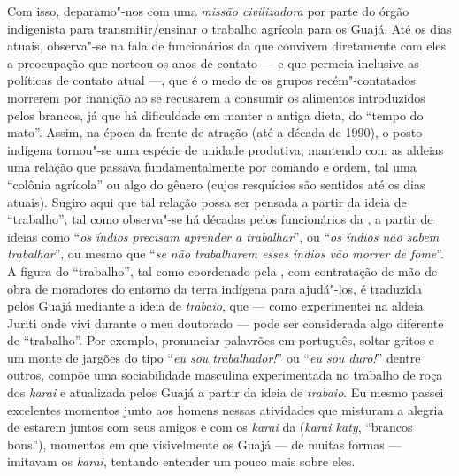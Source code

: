 Com isso, deparamo"-nos com uma \emph{missão civilizadora} por parte do
órgão indigenista para transmitir/ensinar o trabalho agrícola para os
Guajá. Até os dias atuais, observa"-se na fala de funcionários da 
que convivem diretamente com eles a preocupação que norteou os anos de
contato --- e que permeia inclusive as políticas de contato atual ---, que é
o medo de os grupos recém"-contatados morrerem por inanição ao se
recusarem a consumir os alimentos introduzidos pelos brancos, já que há
dificuldade em manter a antiga dieta, do ``tempo do mato''. Assim, na
época da frente de atração (até a década de 1990), o posto indígena
tornou"-se uma espécie de unidade produtiva, mantendo com as aldeias uma
relação que passava fundamentalmente por comando e ordem, tal uma
``colônia agrícola'' ou algo do gênero (cujos resquícios são sentidos
até os dias atuais). Sugiro aqui que tal relação possa ser pensada a
partir da ideia de ``trabalho'', tal como observa"-se há décadas pelos
funcionários da , a partir de ideias como ``\emph{os índios
precisam aprender a trabalhar}'', ou ``\emph{os índios não sabem
trabalhar}'', ou mesmo que ``\emph{se não trabalharem esses índios vão
morrer de fome}''. A figura do ``trabalho'', tal como coordenado pela
, com contratação de mão de obra de moradores do entorno da terra
indígena para ajudá"-los, é traduzida pelos Guajá mediante a ideia de
\emph{trabaio}, que --- como experimentei na aldeia Juriti onde vivi
durante o meu doutorado --- pode ser considerada algo diferente de
``trabalho''. Por exemplo, pronunciar palavrões em português, soltar
gritos e um monte de jargões do tipo ``\emph{eu sou trabalhador!}'' ou
``\emph{eu sou duro!}'' dentre outros, compõe uma sociabilidade
masculina experimentada no trabalho de roça dos \emph{karai} e
atualizada pelos Guajá a partir da ideia de \emph{trabaio}. Eu mesmo
passei excelentes momentos junto aos homens nessas atividades que
misturam a alegria de estarem juntos com seus amigos e com os
\emph{karai} da  (\emph{karai katy}, ``brancos bons''), momentos em
que visivelmente os Guajá --- de muitas formas --- imitavam os \emph{karai},
tentando entender um pouco mais sobre eles.

